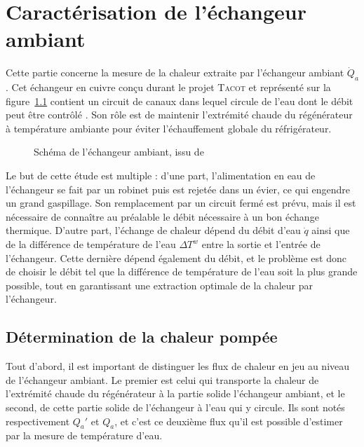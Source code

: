 \chapter{Caractérisation de l'échangeur ambiant}\label{chap:AHX}
Cette partie concerne la mesure de la chaleur extraite par l'échangeur ambiant $\dot Q_a$. Cet échangeur en cuivre conçu durant le projet \textsc{Tacot} et représenté sur la figure~\ref{fig:AHXschema} contient un circuit de canaux dans lequel circule de l'eau dont le débit peut être contrôlé \cite{ANR_thermo-acoustic_2019, ramadan_design_2021}. Son rôle est de maintenir l'extrémité chaude du régénérateur à température ambiante pour éviter l'échauffement globale du réfrigérateur. 

\begin{figure}[!ht]
    \centering
    
    \caption{Schéma de l'échangeur ambiant, issu de \cite{ramadan_design_2021}}
    \label{fig:AHXschema}
\end{figure}

Le but de cette étude est multiple : d'une part, l'alimentation en eau de l'échangeur se fait par un robinet puis est rejetée dans un évier, ce qui engendre un grand gaspillage. Son remplacement par un circuit fermé est prévu, mais il est nécessaire de connaître au préalable le débit nécessaire à un bon échange thermique. D'autre part, l'échange de chaleur dépend du débit d'eau $\dot q$ ainsi que de la différence de température de l'eau $\Delta T^w$ entre la sortie et l'entrée de l'échangeur. Cette dernière dépend également du débit, et le problème est donc de choisir le débit tel que la différence de température de l'eau soit la plus grande possible, tout en garantissant une extraction optimale de la chaleur par l'échangeur.

\section{Détermination de la chaleur pompée}
Tout d'abord, il est important de distinguer les flux de chaleur en jeu au niveau de l'échangeur ambiant. Le premier est celui qui transporte la chaleur de l'extrémité chaude du régénérateur à la partie solide l'échangeur ambiant, et le second, de cette partie solide de l'échangeur à l'eau qui y circule. Ils sont notés respectivement $Q_a'$ et $Q_a$, et c'est ce deuxième flux qu'il est possible d'estimer par la mesure de température d'eau.\smallskip

